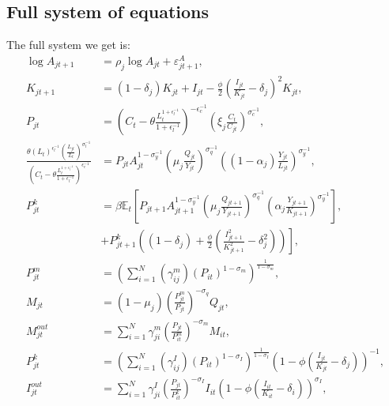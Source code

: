 \subsection{Full system of equations} \label{subsec:EquationsSystem}
The full system we get is:
{\footnotesize
\begin{align*}
\log A_{jt+1} & =\rho_{j}\log A_{jt}+\varepsilon_{jt+1}^{A},\\
K_{jt+1} & =(1-\delta_{j})K_{jt}+I_{jt}-\frac{\phi}{2}\left(\frac{{I_{jt}}}{K_{jt}}-\delta_{j}\right)^{2}K_{jt},\\
P_{jt} & =\left(C_{t}-\theta\frac{L_{t}^{1+\epsilon_{l}^{-1}}}{1+\epsilon_{l}^{-1}}\right)^{-\epsilon_{c}^{-1}}\left(\xi_{j}\frac{{C_{t}}}{C_{jt}}\right)^{\sigma_{c}^{-1}},\\
\frac{\theta\left(L_{t}\right)^{\epsilon_{l}^{-1}}\left(\frac{{L_{jt}}}{L_{t}}\right)^{\sigma_{l}^{-1}}}{\left(C_{t}-\theta\frac{L_{t}^{1+\epsilon_{l}^{-1}}}{1+\epsilon_{l}^{-1}}\right)^{\epsilon_{c}^{-1}}} & =P_{jt}A_{jt}^{1-\sigma_{y}^{-1}}\left(\mu_{j}\frac{{Q_{jt}}}{Y_{jt}}\right)^{\sigma_{q}^{-1}}\left(\left(1-\alpha_{j}\right)\frac{{Y_{jt}}}{L_{jt}}\right)^{\sigma_{y}^{-1}},\\
P_{jt}^{k} & =\beta\mathbb{{E}}_{t}\left[P_{jt+1}A_{jt+1}^{1-\sigma_{y}^{-1}}\left(\mu_{j}\frac{{Q_{jt+1}}}{Y_{jt+1}}\right)^{\sigma_{q}^{-1}}\left(\alpha_{j}\frac{{Y_{jt+1}}}{K_{jt+1}}\right)^{\sigma_{y}^{-1}}\right], \\
 & \left.+P_{jt+1}^{k}\left((1-\delta_{j})+\frac{\phi}{2}\left(\frac{I_{jt+1}^{2}}{K_{jt+1}^{2}}-\delta_{j}^{2}\right)\right)\right],\\
P_{jt}^{m} & =\left(\sum_{i=1}^{N}\left(\gamma_{ij}^{m}\right)\left(P_{it}\right)^{1-\sigma_{m}}\right)^{\frac{{1}}{1-\sigma_{m}}},\\
M_{jt} & =\left(1-\mu_{j}\right)\left(\frac{P_{jt}^{m}}{P_{jt}}\right)^{-\sigma_{q}}Q_{jt},\\
M_{jt}^{out} & =\sum_{i=1}^{N}\gamma_{ji}^{m}\left(\frac{{P_{jt}}}{P_{it}^{m}}\right)^{-\sigma_{m}}M_{it},\\
P_{jt}^{k} & =\left(\sum_{i=1}^{N}\left(\gamma_{ij}^{I}\right)\left(P_{it}\right)^{1-\sigma_{I}}\right)^{\frac{1}{1-\sigma_{I}}}\left(1-\phi\left(\frac{I_{jt}}{K_{jt}}-\delta_{j}\right)\right)^{-1},\\
I_{jt}^{out} & =\sum_{i=1}^{N}\gamma_{ji}^{I}\left(\frac{{P_{jt}}}{P_{it}^{k}}\right)^{-\sigma_{I}}I_{it}\left(1-\phi\left(\frac{I_{it}}{K_{it}}-\delta_{i}\right)\right)^{\sigma_{I}},\\

\end{align*}}
